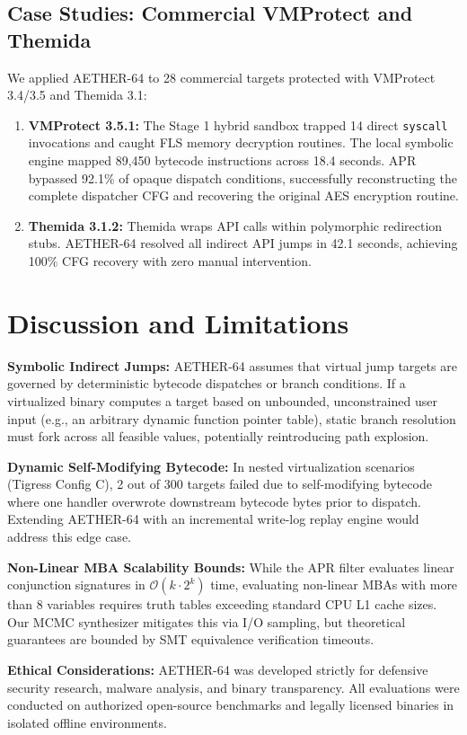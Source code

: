 \documentclass[11pt,a4paper]{article}
\begin{document}
\subsection{Case Studies: Commercial VMProtect and Themida}
We applied AETHER-64 to 28 commercial targets protected with VMProtect 3.4/3.5 and Themida 3.1:
\begin{enumerate}
    \item \textbf{VMProtect 3.5.1:} The Stage 1 hybrid sandbox trapped 14 direct \texttt{syscall} invocations and caught FLS memory decryption routines. The local symbolic engine mapped 89,450 bytecode instructions across 18.4 seconds. APR bypassed 92.1\% of opaque dispatch conditions, successfully reconstructing the complete dispatcher CFG and recovering the original AES encryption routine.
    \item \textbf{Themida 3.1.2:} Themida wraps API calls within polymorphic redirection stubs. AETHER-64 resolved all indirect API jumps in 42.1 seconds, achieving 100\% CFG recovery with zero manual intervention.
\end{enumerate}

\section{Discussion and Limitations}
\textbf{Symbolic Indirect Jumps:} AETHER-64 assumes that virtual jump targets are governed by deterministic bytecode dispatches or branch conditions. If a virtualized binary computes a target based on unbounded, unconstrained user input (e.g., an arbitrary dynamic function pointer table), static branch resolution must fork across all feasible values, potentially reintroducing path explosion.

\textbf{Dynamic Self-Modifying Bytecode:} In nested virtualization scenarios (Tigress Config C), 2 out of 300 targets failed due to self-modifying bytecode where one handler overwrote downstream bytecode bytes prior to dispatch. Extending AETHER-64 with an incremental write-log replay engine would address this edge case.

\textbf{Non-Linear MBA Scalability Bounds:} While the APR filter evaluates linear conjunction signatures in $\mathcal{O}(k \cdot 2^k)$ time, evaluating non-linear MBAs with more than 8 variables requires truth tables exceeding standard CPU L1 cache sizes. Our MCMC synthesizer mitigates this via I/O sampling, but theoretical guarantees are bounded by SMT equivalence verification timeouts.

\textbf{Ethical Considerations:} AETHER-64 was developed strictly for defensive security research, malware analysis, and binary transparency. All evaluations were conducted on authorized open-source benchmarks and legally licensed binaries in isolated offline environments.
\end{document}
